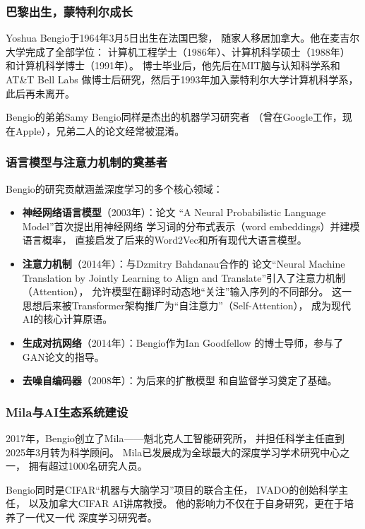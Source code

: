 \subsubsection{巴黎出生，蒙特利尔成长}
Yoshua Bengio于1964年3月5日出生在法国巴黎，
随家人移居加拿大。他在麦吉尔大学完成了全部学位：
计算机工程学士（1986年）、计算机科学硕士（1988年）
和计算机科学博士（1991年）。
博士毕业后，他先后在MIT脑与认知科学系和AT\&T Bell Labs
做博士后研究，然后于1993年加入蒙特利尔大学计算机科学系，
此后再未离开。

Bengio的弟弟Samy Bengio同样是杰出的机器学习研究者
（曾在Google工作，现在Apple），兄弟二人的论文经常被混淆。

\subsubsection{语言模型与注意力机制的奠基者}
Bengio的研究贡献涵盖深度学习的多个核心领域：

\begin{itemize}[noitemsep]
  \item \textbf{神经网络语言模型}（2003年）：论文
    ``A Neural Probabilistic Language Model''首次提出用神经网络
    学习词的分布式表示（word embeddings）并建模语言概率，
    直接启发了后来的Word2Vec和所有现代大语言模型。
  \item \textbf{注意力机制}（2014年）：与Dzmitry Bahdanau合作的
    论文``Neural Machine Translation by Jointly Learning to Align
    and Translate''引入了注意力机制（Attention），
    允许模型在翻译时动态地``关注''输入序列的不同部分。
    这一思想后来被Transformer架构推广为``自注意力''（Self-Attention），
    成为现代AI的核心计算原语。
  \item \textbf{生成对抗网络}（2014年）：Bengio作为Ian Goodfellow
    的博士导师，参与了GAN论文的指导。
  \item \textbf{去噪自编码器}（2008年）：为后来的扩散模型
    和自监督学习奠定了基础。
\end{itemize}

\subsubsection{Mila与AI生态系统建设}
2017年，Bengio创立了Mila——魁北克人工智能研究所，
并担任科学主任直到2025年3月转为科学顾问。
Mila已发展成为全球最大的深度学习学术研究中心之一，
拥有超过1000名研究人员。

Bengio同时是CIFAR``机器与大脑学习''项目的联合主任，
IVADO的创始科学主任，
以及加拿大CIFAR AI讲席教授。
他的影响力不仅在于自身研究，更在于培养了一代又一代
深度学习研究者。

